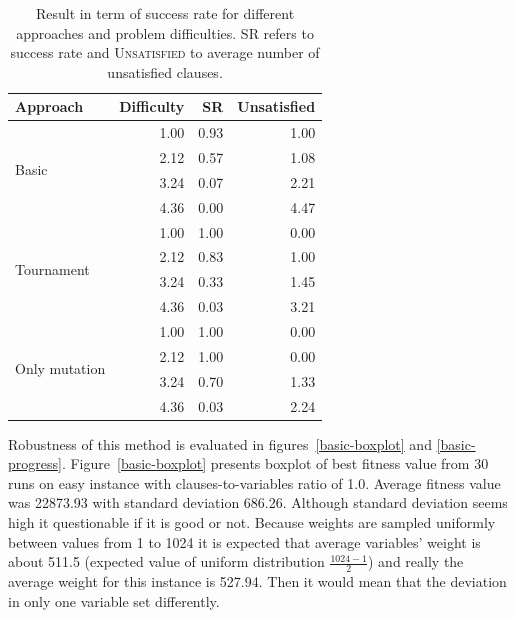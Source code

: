 \documentclass{article}
\begin{document}
\begin{table}[ht]
\caption{Result in term of success rate for different approaches and
problem difficulties.
\textsc{SR} refers to success rate
and \textsc{Unsatisfied} to average number of unsatisfied clauses.}
\label{result-table}
\vskip 0.15in
\begin{center}
\begin{small}
\begin{sc}
\begin{tabular}{lrrr}
\toprule
Approach & Difficulty & SR & Unsatisfied \\
\midrule
\multirow{4}{*}{Basic} & 1.00 & 0.93 & 1.00 \\
                       & 2.12 & 0.57 & 1.08 \\
                       & 3.24 & 0.07 & 2.21 \\
                       & 4.36 & 0.00 & 4.47 \\
\midrule
\multirow{4}{*}{Tournament} & 1.00 & 1.00 & 0.00 \\
                            & 2.12 & 0.83 & 1.00 \\
                            & 3.24 & 0.33 & 1.45 \\
                            & 4.36 & 0.03 & 3.21 \\
\midrule
\multirow{4}{*}{Only mutation} & 1.00 & 1.00 & 0.00 \\
                               & 2.12 & 1.00 & 0.00 \\
                               & 3.24 & 0.70 & 1.33 \\
                               & 4.36 & 0.03 & 2.24 \\
\bottomrule
\end{tabular}
\end{sc}
\end{small}
\end{center}
\vskip -0.1in
\end{table}

Robustness of this method is evaluated in figures~\ref{basic-boxplot}
and \ref{basic-progress}.
Figure~\ref{basic-boxplot} presents boxplot of best fitness value from 30 runs
on easy instance with clauses-to-variables ratio of 1.0.
Average fitness value was 22873.93 with standard deviation 686.26.
Although standard deviation seems high it questionable if it is good or not.
Because weights are sampled uniformly between values from 1 to 1024
it is expected that average variables' weight is about
511.5 (expected value of uniform distribution $\frac{1024 - 1}{2}$)
and really the average weight for this instance is 527.94.
Then it would mean that the deviation in only one variable set differently.
\end{document}
